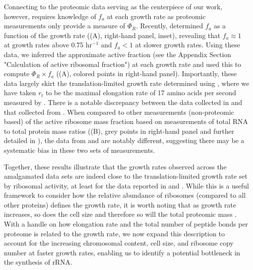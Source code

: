 Connecting  to the proteomic data serving as the centerpiece of
our work, however, requires knowledge of $f_a$ at each growth rate as proteomic
measurements only provide a measure of $\Phi_R$. Recently, \cite{dai2016}
determined $f_a$ as a function of the growth rate ((A),
right-hand panel, inset), revealing that $f_a \approx 1$ at growth rates above
0.75 hr$^{-1}$ and $f_a < 1$ at slower growth rates. Using these data, we
inferred the approximate active fraction (see the Appendix Section "Calculation
of active ribosomal fraction") at each growth rate and used this to compute
$\Phi_R \times f_a$ ((A), colored points in right-hand
panel). Importantly, these data largely skirt the translation-limited growth rate
determined using , where we have taken $r_t$ to be the maximal
elongation rate of 17 amino acids per second measured by \cite{dai2016}. There
is a notable discrepancy between the data collected in \cite{schmidt2016,
li2014} and that collected from \cite{valgepea2013, peebo2015}. When compared to
other measurements (non-proteomic based) of the active ribosome mass fraction
based on measurements of total RNA to total protein mass ratios
((B), grey points in right-hand panel and  further detailed
in ), the data from
\cite{valgepea2013} and \cite{peebo2015} are notably different, suggesting there
may be a systematic bias in these two sets of measurements.

Together, these results illustrate that the growth rates observed across the
amalgamated data sets are indeed close to the translation-limited growth rate
set by ribosomal activity, at least for the data reported in \cite{schmidt2016}
and \cite{li2014}. While this is a useful framework to consider how the relative
abundance of ribosomes (compared to all other proteins) defines the growth rate,
it is worth noting that as growth rate increases, so does the cell size and
therefore so will the total proteomic mass \citep{basan2015}. With a handle on
how elongation rate and the total number of peptide bonds per proteome is
related to the growth rate, we now expand this description to account for the
increasing chromosomal content, cell size, and  ribosome copy number at faster
growth rates, enabling us to identify a potential bottleneck in the synthesis of
rRNA.

